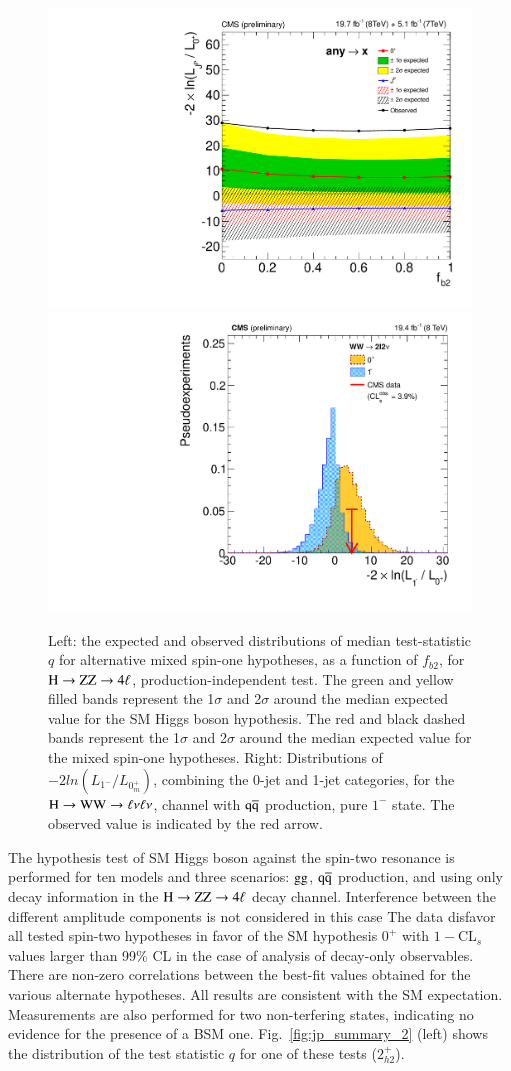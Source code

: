\begin{figure}[th!]
  \begin{center}
\centerline{
\includegraphics[width=0.50\linewidth]{figures/hzz_spin1_summary_PI.pdf}
\includegraphics[width=0.50\linewidth]{figures/hzww_spin1_q1minus.pdf}
}
\caption{Left: the expected and observed distributions of median
  test-statistic $q$ for alternative mixed spin-one hypotheses, as
  a function of $f_{b2}$, for $\mathrm{H}\to\mathrm{Z}\mathrm{Z}\to4\ell$, production-independent
  test.  The green and yellow filled bands represent the 1$\sigma$
  and 2$\sigma$ around the median expected value for the SM Higgs
  boson hypothesis. The red and black dashed bands represent the
  1$\sigma$ and 2$\sigma$ around the median expected value for the
  mixed spin-one hypotheses.  Right: Distributions of $-2
  ln(L_{1^-} /L_{0^{+}_{m}})$, combining the 0-jet and 1-jet
  categories, for the $\mathrm{H}\to\mathrm{W}\mathrm{W}\to\ell\nu\ell\nu$, channel with $\mathrm{\mathrm{q}\mathrm{\overline{q}}}$
  production, pure $1^-$ state. The observed value is indicated by
  the red arrow.
  \label{fig:jp_summary_1}} 
  \end{center}
\end{figure}

The hypothesis test of SM Higgs boson against the spin-two resonance
is performed for ten models and three scenarios: $\mathrm{g}\mathrm{g}$, $\mathrm{\mathrm{q}\mathrm{\overline{q}}}$
production, and using only decay information in the $\mathrm{H}\to\mathrm{Z}\mathrm{Z}\to4\ell$ decay
channel. Interference between the different amplitude components is
not considered in this case The data disfavor all tested spin-two
hypotheses in favor of the SM hypothesis $0^+$ with $1-$CL$_s$ values
larger than 99\% CL in the case of analysis of decay-only observables.
There are non-zero correlations between the best-fit values obtained
for the various alternate hypotheses.  All results are consistent with
the SM expectation. Measurements are also performed for two
non-terfering states, indicating no evidence for the presence of a BSM
one. Fig.~\ref{fig:jp_summary_2} (left) shows the distribution of the test 
statistic $q$ for one of these tests ($2_{h2}^+$).

